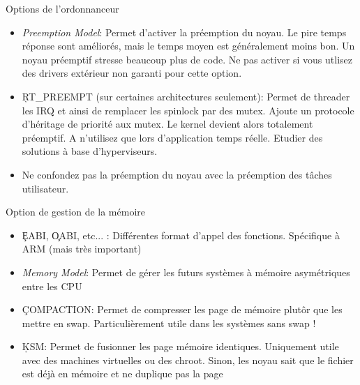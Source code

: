 \begin{frame}[fragile=singleslide]{Options de l'ordonnanceur}
  \begin{itemize} 
  \item  \emph{Preemption Model}: Permet  d'activer la  préemption du
    noyau. Le pire temps réponse sont améliorés, mais le temps moyen
    est généralement moins bon.  Un noyau préemptif stresse beaucoup
    plus  de code.   Ne  pas  activer si  vous  utlisez des  drivers
    extérieur non garanti pour cette option.
  \item  \c{RT_PREEMPT}   (sur  certaines  architectures  seulement):
    Permet de  threader les IRQ  et ainsi de remplacer  les spinlock
    par des  mutex.  Ajoute un protocole d'héritage  de priorité aux
    mutex.  Le   kernel  devient  alors   totalement  préemptif.   A
    n'utilisez  que lors  d'application temps  réelle.   Etudier des
    solutions à base d'hyperviseurs.
  \item Ne confondez  pas la préemption du noyau  avec la préemption
    des tâches utilisateur.
  \end{itemize}
\end{frame}  

\begin{frame}[fragile=singleslide]{Option de gestion de la mémoire}
  \begin{itemize} 
  \item \c{EABI},  \c{OABI}, etc... : Différentes  format d'appel des
    fonctions. Spécifique à ARM (mais très important)
  \item  \emph{Memory Model}: Permet  de gérer  les futurs  systèmes à
    mémoire asymétriques entre les CPU
  \item  \c{COMPACTION}: Permet  de  compresser les  page de  mémoire
    plutôr que  les mettre en swap. Particulièrement  utile dans les
    systèmes sans swap !
  \item  \c{KSM}: Permet  de  fusionner les  page mémoire  identiques.
    Uniquement   utile   avec   des   machines   virtuelles   ou   des
    chroot. Sinon, les  noyau sait que le fichier  est déjà en mémoire
    et ne duplique pas la page
  \end{itemize} 
\end{frame}

